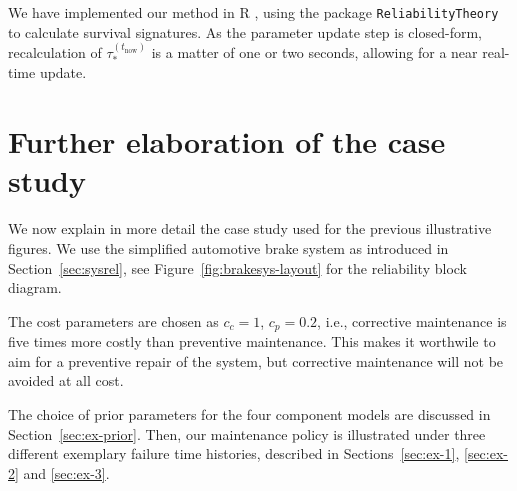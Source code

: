 \documentclass[authoryear]{elsarticle}
\def\tnow{t_\text{now}}
\newcommand{\gnow}{g^{(\tnow)}}
\newcommand{\tausnow}{\tau_*^{(\tnow)}}
\begin{document}
We have implemented our method in \textsf{R} \citep{R},
using the package \texttt{ReliabilityTheory} \citep{2016:aslett-RT}
to calculate survival signatures.
As the parameter update step is closed-form,
recalculation of $\tausnow$ is a matter of one or two seconds,
allowing for a near real-time update.
%


\section{Further elaboration of the case study}
\label{sec:examples}

We now explain in more detail the case study used for the previous illustrative figures.
We use the simplified automotive brake system as introduced in Section~\ref{sec:sysrel},
see Figure~\ref{fig:brakesys-layout} for the reliability block diagram.

The cost parameters are chosen as $c_c = 1$, $c_p = 0.2$, %
i.e., corrective maintenance is five times more costly than preventive maintenance.
This makes it worthwile to aim for a preventive repair of the system,
but corrective maintenance will not be avoided at all cost.

The choice of prior parameters for the four component models are discussed in Section~\ref{sec:ex-prior}.
Then, our maintenance policy is illustrated under three different exemplary failure time histories,
described in Sections~\ref{sec:ex-1}, \ref{sec:ex-2} and \ref{sec:ex-3}.
\end{document}
